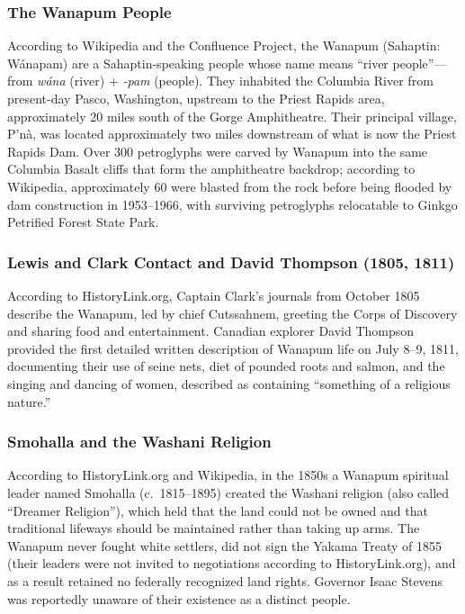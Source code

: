 \documentclass[11pt,letterpaper]{article}
\begin{document}
\subsubsection{The Wanapum People}

According to Wikipedia and the Confluence Project, the Wanapum (Sahaptin: W\'{a}napam) are a Sahaptin-speaking people whose name means ``river people''---from \textit{w\'{a}na} (river) + \textit{-pam} (people). They inhabited the Columbia River from present-day Pasco, Washington, upstream to the Priest Rapids area, approximately 20 miles south of the Gorge Amphitheatre. Their principal village, P'n\`a, was located approximately two miles downstream of what is now the Priest Rapids Dam. Over 300 petroglyphs were carved by Wanapum into the same Columbia Basalt cliffs that form the amphitheatre backdrop; according to Wikipedia, approximately 60 were blasted from the rock before being flooded by dam construction in 1953--1966, with surviving petroglyphs relocatable to Ginkgo Petrified Forest State Park.

\subsubsection{Lewis and Clark Contact and David Thompson (1805, 1811)}

According to HistoryLink.org, Captain Clark's journals from October 1805 describe the Wanapum, led by chief Cutssahnem, greeting the Corps of Discovery and sharing food and entertainment. Canadian explorer David Thompson provided the first detailed written description of Wanapum life on July 8--9, 1811, documenting their use of seine nets, diet of pounded roots and salmon, and the singing and dancing of women, described as containing ``something of a religious nature.''

\subsubsection{Smohalla and the Washani Religion}

According to HistoryLink.org and Wikipedia, in the 1850s a Wanapum spiritual leader named Smohalla (c.\ 1815--1895) created the Washani religion (also called ``Dreamer Religion''), which held that the land could not be owned and that traditional lifeways should be maintained rather than taking up arms. The Wanapum never fought white settlers, did not sign the Yakama Treaty of 1855 (their leaders were not invited to negotiations according to HistoryLink.org), and as a result retained no federally recognized land rights. Governor Isaac Stevens was reportedly unaware of their existence as a distinct people.
\end{document}
